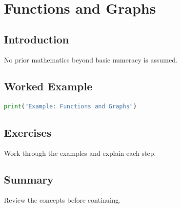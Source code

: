 \chapter{Functions and Graphs}
\label{chap:vol4-4}



\section{Introduction}
No prior mathematics beyond basic numeracy is assumed.

\section{Worked Example}
\begin{lstlisting}[language=Python]
print("Example: Functions and Graphs")
\end{lstlisting}

\section{Exercises}
\begin{exercise}
Work through the examples and explain each step.
\end{exercise}

\section{Summary}
Review the concepts before continuing.
